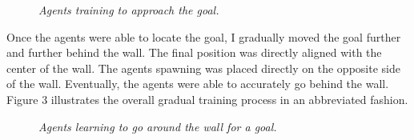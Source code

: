\documentclass{article} %
\begin{document}
\begin{figure}[H]
	\centering
		\caption{\textit{Agents training to approach the goal.}}
        \label{fig:default}
\end{figure} 

Once the agents were able to locate the goal, I gradually moved the goal further and further behind the wall. The final position was directly aligned with the center of the wall. The agents spawning was placed directly on the opposite side of the wall. Eventually, the agents were able to accurately go behind the wall. Figure 3 illustrates the overall gradual training process in an abbreviated fashion.

\begin{figure}[h]%
	\centering
    	\hfill%
        \hfill%
    \caption{\textit{Agents learning to go around the wall for a goal.}}
    \label{fig:default}
\end{figure}  
\end{document}
